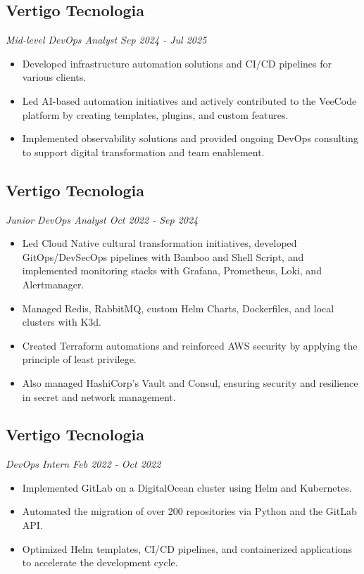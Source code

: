 \documentclass[a4paper,10pt]{article}
\begin{document}
\subsection*{\texorpdfstring{
\textbf{ Vertigo Tecnologia } \hfill 
}{
Vertigo Tecnologia -- 
}}
\textit{ Mid-level DevOps Analyst \hfill Sep 2024 - Jul 2025 }
\begin{itemize}
\item Developed infrastructure automation solutions and CI/CD pipelines for various clients.
\item Led AI-based automation initiatives and actively contributed to the VeeCode platform by creating templates, plugins, and custom features.
\item Implemented observability solutions and provided ongoing DevOps consulting to support digital transformation and team enablement.
\end{itemize}
\subsection*{\texorpdfstring{
\textbf{ Vertigo Tecnologia } \hfill 
}{
Vertigo Tecnologia -- 
}}
\textit{ Junior DevOps Analyst \hfill Oct 2022 - Sep 2024 }
\begin{itemize}
\item Led Cloud Native cultural transformation initiatives, developed GitOps/DevSecOps pipelines with Bamboo and Shell Script, and implemented monitoring stacks with Grafana, Prometheus, Loki, and Alertmanager.
\item Managed Redis, RabbitMQ, custom Helm Charts, Dockerfiles, and local clusters with K3d.
\item Created Terraform automations and reinforced AWS security by applying the principle of least privilege.
\item Also managed HashiCorp's Vault and Consul, ensuring security and resilience in secret and network management.
\end{itemize}
\subsection*{\texorpdfstring{
\textbf{ Vertigo Tecnologia } \hfill 
}{
Vertigo Tecnologia -- 
}}
\textit{ DevOps Intern \hfill Feb 2022 - Oct 2022 }
\begin{itemize}
\item Implemented GitLab on a DigitalOcean cluster using Helm and Kubernetes.
\item Automated the migration of over 200 repositories via Python and the GitLab API.
\item Optimized Helm templates, CI/CD pipelines, and containerized applications to accelerate the development cycle.
\end{itemize}
\end{document}
